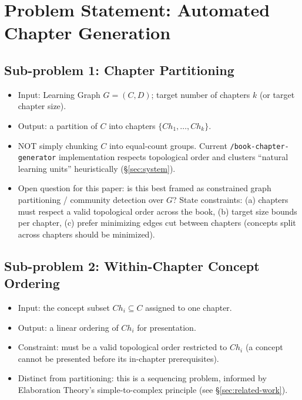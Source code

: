 
\section{Problem Statement: Automated Chapter Generation}
\label{sec:problem-statement}


\subsection{Sub-problem 1: Chapter Partitioning}
\begin{itemize}
    \item Input: Learning Graph $G=(C,D)$; target number of chapters $k$ (or target
          chapter size).
    \item Output: a partition of $C$ into chapters $\{Ch_1, \ldots, Ch_k\}$.
    \item NOT simply chunking $C$ into equal-count groups. Current
          \texttt{/book-chapter-generator} implementation respects topological
          order and clusters ``natural learning units'' heuristically
          (\S\ref{sec:system}).
    \item Open question for this paper: is this best framed as constrained graph
          partitioning / community detection over $G$? State constraints:
          (a) chapters must respect a valid topological order across the book,
          (b) target size bounds per chapter, (c) prefer minimizing edges cut
          between chapters (concepts split across chapters should be minimized).
\end{itemize}

\subsection{Sub-problem 2: Within-Chapter Concept Ordering}
\begin{itemize}
    \item Input: the concept subset $Ch_i \subseteq C$ assigned to one chapter.
    \item Output: a linear ordering of $Ch_i$ for presentation.
    \item Constraint: must be a valid topological order restricted to $Ch_i$
          (a concept cannot be presented before its in-chapter prerequisites).
    \item Distinct from partitioning: this is a sequencing problem, informed by
          Elaboration Theory's simple-to-complex principle \cite{reigeluth1983}
          (see \S\ref{sec:related-work}).
\end{itemize}

